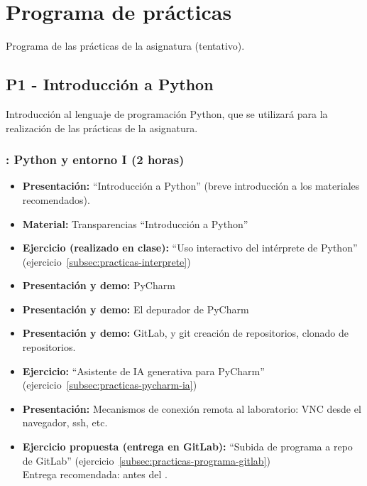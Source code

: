 \documentclass[a4paper,12pt]{article}
\begin{document}
\section{Programa de prácticas}

Programa de las prácticas de la asignatura (tentativo).

\subsection{P1 - Introducción a Python}

Introducción al lenguaje de programación Python, que se utilizará para la realización de las prácticas de la asignatura.

\subsubsection{\martesA: Python y entorno I  (2 horas)}
\label{cal:martesA}

\begin{itemize}
\item \textbf{Presentación:} ``Introducción a Python'' (breve introducción a los materiales recomendados).
\item \textbf{Material:} Transparencias ``Introducción a Python''
\item \textbf{Ejercicio (realizado en clase):} ``Uso interactivo del intérprete de Python'' (ejercicio~\ref{subsec:practicas-interprete})
\item \textbf{Presentación y demo:} PyCharm
\item \textbf{Presentación y demo:} El depurador de PyCharm
\item \textbf{Presentación y demo:} GitLab, y git creación de repositorios, clonado de repositorios.
\item \textbf{Ejercicio:} ``Asistente de IA generativa para PyCharm'' (ejercicio~\ref{subsec:practicas-pycharm-ia})
\item \textbf{Presentación:} Mecanismos de conexión remota al laboratorio: VNC desde el navegador, ssh, etc.
\item \textbf{Ejercicio propuesta (entrega en GitLab):} ``Subida de programa a repo de GitLab'' (ejercicio~\ref{subsec:practicas-programa-gitlab}) \\
   Entrega recomendada: antes del \martesB.
\end{itemize}
\end{document}
